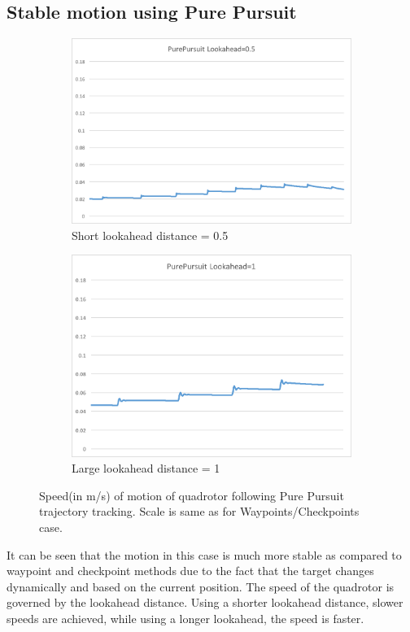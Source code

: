 \documentclass[hidelinks,BTech]{iitmdiss}
\begin{document}
\subsection{Stable motion using Pure Pursuit}
\begin{figure}[H]
  \centering
  \begin{subfigure}[t]{0.48\textwidth}
  \includegraphics[width=\textwidth]{Pure_Pursuit_speed_0_5.png}
      \caption{Short lookahead distance = 0.5}
  \end{subfigure}
  \begin{subfigure}[t]{0.48\textwidth}
    \centering
      \includegraphics[width=\textwidth]{Pure_Pursuit_speed_1.png}
      \caption{Large lookahead distance = 1}
  \end{subfigure}
  \caption{Speed(in m/s) of motion of quadrotor following Pure Pursuit trajectory tracking. Scale is same as for Waypoints/Checkpoints case.}
\end{figure}
It can be seen that the motion in this case is much more stable as compared to waypoint and checkpoint methods due to the fact that the target changes dynamically and based on the current position. The speed of the quadrotor is governed by the lookahead distance. Using a shorter lookahead distance, slower speeds are achieved, while using a longer lookahead, the speed is faster.
\end{document}
